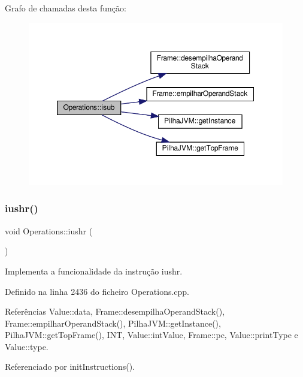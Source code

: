 Grafo de chamadas desta função\+:
\nopagebreak
\begin{figure}[H]
\begin{center}
\leavevmode
\includegraphics[width=350pt]{classOperations_ab2808e99336de64fefb2a9073bc251de_cgraph}
\end{center}
\end{figure}
\mbox{\label{classOperations_ae3ab5ae36e587a47832886fdf4f8b2a6}} 
\subsubsection{\texorpdfstring{iushr()}{iushr()}}
{\footnotesize\ttfamily void Operations\+::iushr (\begin{DoxyParamCaption}{ }\end{DoxyParamCaption})\hspace{0.3cm}{\ttfamily [private]}}



Implementa a funcionalidade da instrução iushr. 



Definido na linha 2436 do ficheiro Operations.\+cpp.



Referências Value\+::data, Frame\+::desempilha\+Operand\+Stack(), Frame\+::empilhar\+Operand\+Stack(), Pilha\+J\+V\+M\+::get\+Instance(), Pilha\+J\+V\+M\+::get\+Top\+Frame(), I\+NT, Value\+::int\+Value, Frame\+::pc, Value\+::print\+Type e Value\+::type.



Referenciado por init\+Instructions().

